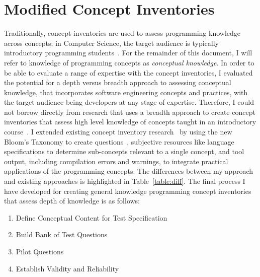 \section{Modified Concept Inventories}

Traditionally, concept inventories are used to  assess programming knowledge across concepts; in Computer Science, the target audience is typically introductory programming students~\cite{tew2010developing,kaczmarczyk2010identifying}. 
For the remainder of this document, I will refer to knowledge of programming concepts as \textit{conceptual knowledge}.  
In order to be able to evaluate a range of expertise with the concept inventories, I evaluated the potential for a depth versus breadth approach to assessing conceptual knowledge, that incorporates software engineering concepts and practices, with the target audience being developers at any stage of expertise.
Therefore, I could not borrow directly from research that uses a breadth approach to create concept inventories that assess high level knowledge of concepts taught in an introductory course~\cite{tew2010assessing}. I extended existing concept inventory research~\cite{tew2010developing,nelson1967testing} by using the new Bloom's Taxonomy to create questions~\cite{scott2003bloom,thompson2008bloom, starr2008bloom}, subjective resources like language specifications to determine sub-concepts relevant to a single concept, and tool output, including compilation errors and warnings, to integrate practical applications of the programming concepts. The differences between my approach and existing approaches is highlighted in Table~\ref{table:diff}.
The final process I have developed for creating general knowledge programming concept inventories that assess depth of knowledge is as follows:

\begin{enumerate}
    \item Define Conceptual Content for Test Specification
    \item Build Bank of Test Questions
    \item Pilot Questions
    \item Establish Validity and Reliability
\end{enumerate}




